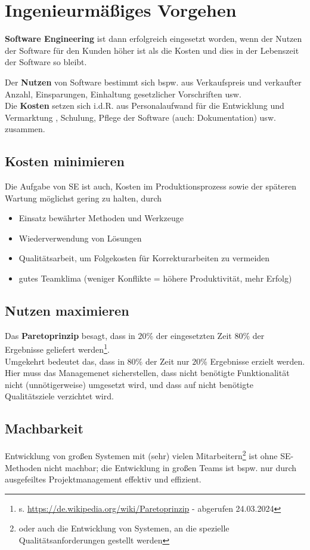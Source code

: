 \section{Ingenieurmäßiges Vorgehen}

\begin{tcolorbox}
    \textbf{Software Engineering} ist dann erfolgreich eingesetzt worden, wenn der Nutzen der Software für den Kunden höher ist als die Kosten und dies in der Lebenszeit der Software so bleibt.
\end{tcolorbox}

\noindent
Der \textbf{Nutzen} von Software bestimmt sich bspw. aus Verkaufspreis und verkaufter Anzahl, Einsparungen, Einhaltung gesetzlicher Vorschriften usw.\\

\noindent
Die \textbf{Kosten} setzen sich i.d.R. aus Personalaufwand für die Entwicklung und Vermarktung , Schulung, Pflege der Software (auch: Dokumentation) usw. zusammen.\\

\subsection*{Kosten minimieren}
Die Aufgabe von SE ist auch, Kosten im Produktionsprozess sowie der späteren Wartung möglichst gering zu halten, durch
\begin{itemize}
    \item Einsatz bewährter Methoden und Werkzeuge
    \item Wiederverwendung von Lösungen
    \item Qualitätsarbeit, um Folgekosten für Korrekturarbeiten zu vermeiden
    \item gutes Teamklima (weniger Konflikte = höhere Produktivität, mehr Erfolg)
\end{itemize}

\subsection*{Nutzen maximieren}
Das \textbf{Paretoprinzip} besagt, dass in $20$\% der eingesetzten Zeit $80$\% der Ergebnisse geliefert werden\footnote{
s. \url{https://de.wikipedia.org/wiki/Paretoprinzip} - abgerufen 24.03.2024
}.\\
Umgekehrt bedeutet das, dass in $80$\% der Zeit nur $20$\% Ergebnisse erzielt werden.\\
Hier muss das Managemenet sicherstellen, dass nicht benötigte Funktionalität nicht (unnötigerweise) umgesetzt wird, und dass auf nicht benötigte Qualitätsziele verzichtet wird.\\

\subsection*{Machbarkeit}
Entwicklung von großen Systemen mit (sehr) vielen Mitarbeitern\footnote{
oder auch die Entwicklung von Systemen, an die spezielle Qualitätsanforderungen gestellt werden} ist ohne SE-Methoden nicht machbar; die Entwicklung in großen Teams ist bspw. nur durch ausgefeiltes Projektmanagement effektiv und effizient.
